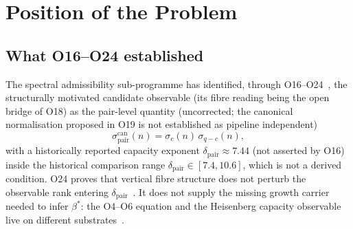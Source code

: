 \documentclass[11pt,a4paper]{article}
\theoremstyle{definition}
\newcommand{\dpair}{\delta_{\mathrm{pair}}}
\newcommand{\bstar}{\beta^{*}}
\newcommand{\sigpair}{\sigma^{\mathrm{can}}_{\mathrm{pair}}}
\begin{document}
\begin{abstract}
    O14 normalization correction, which brought the small-$q$ values into that range, becomes
    progressively unnecessary at large $q$ and eventually overcorrects, sending the corrected
    quantity below the lower edge $7.4$.
    Membership of the range is therefore a property of the raw observable, not of the corrected
    one; the range itself is a historical comparison, not a derived condition.
    Third, the asymptotic value $\delta_\infty$ remains insufficiently constrained by the
    accessible range: competing convergence laws --- notably $1/q$ and $1/\sqrt{q}$ --- remain
    statistically viable, so no single extrapolated $\delta_\infty$ is claimed.
    For comparison only, applying the legacy reciprocal map
    $\bstar = 1/(\dpair + \tfrac12)$ produces the narrow interval $0.108$--$0.123$ across
    $q \in \{211, \dots, 601\}$.  This is a phenomenological numerical coincidence, not a
    Heisenberg capacity-to-rate inference.

    \medskip\noindent
    \textbf{Keywords.}
    Cosmochrony; spectral admissibility; pair-level observable; Weil representation;
    Heisenberg graphs; capacity exponent; convergence; inter-pair concentration;
    normalization correction; window depth; BFS; asymptotic analysis; large-prime extension

  \end{abstract}

  \clearpage
  \tableofcontents

  \clearpage

  \section{Position of the Problem}

    \subsection{What O16--O24 established}

      The spectral admissibility sub-programme has identified, through
      O16--O24~\cite{Beau2026a20,Beau2026a21,Beau2026a22,Beau2026a23,Beau2026a24,
    Beau2026a25,Beau2026a26,Beau2026a27,Beau2026a28},
      the structurally motivated candidate observable (its fibre reading being the
      open bridge of O18) as the pair-level quantity (uncorrected; the canonical normalisation
      proposed in O19 is not established as pipeline independent)
      \begin{equation}
        \sigpair(n) = \sigma_c(n)\,\sigma_{q-c}(n),
      \end{equation}
      with a historically reported capacity exponent $\dpair \approx 7.44$ (not asserted by O16)
      inside the historical comparison range
      $\dpair \in [7.4, 10.6]$, which is not a derived condition.
      O24 proves that vertical fibre structure does not perturb the observable rank entering
      $\dpair$~\cite{Beau2026a28}.  It does not supply the missing growth carrier needed to infer
      $\bstar$: the O4--O6 equation and the Heisenberg capacity observable live on different
      substrates~\cite{Beau2026sgn}.
\end{document}
